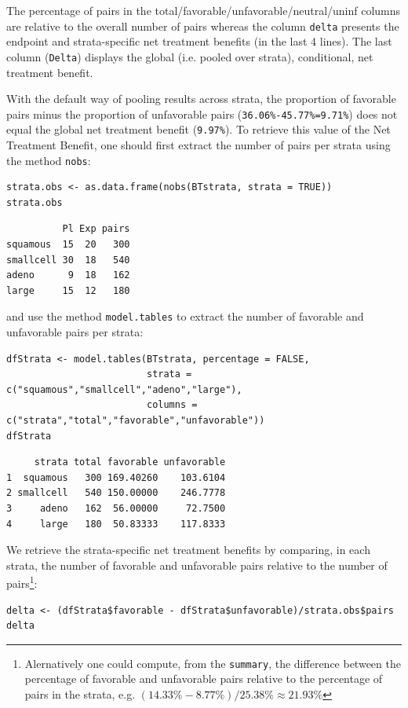 \documentclass[12pt]{article}
\newcommand\Warning[1][3ex]{%
\renewcommand\stacktype{L}%
\scaleto{\stackon[1.3pt]{\color{red}$\triangle$}{\tiny\bfseries !}}{#1}%
\xspace
}
\begin{document}
The percentage of pairs in the
total/favorable/unfavorable/neutral/uninf columns are relative to the
overall number of pairs whereas the column \texttt{delta} presents the
endpoint and strata-specific net treatment benefits (in the last 4
lines). The last column (\texttt{Delta}) displays the global (i.e. pooled
over strata), conditional, net treatment benefit. \newline \Warning
With the default way of pooling results across strata, the proportion
of favorable pairs minus the proportion of unfavorable pairs
(\texttt{36.06\%-45.77\%=9.71\%}) does not equal the global net treatment
benefit (\texttt{9.97\%}). To retrieve this value of the Net Treatment
Benefit, one should first extract the number of pairs per strata using
the method \texttt{nobs}:
\lstset{language=r,label= ,caption= ,captionpos=b,numbers=none}
\begin{lstlisting}
strata.obs <- as.data.frame(nobs(BTstrata, strata = TRUE))
strata.obs
\end{lstlisting}

\begin{verbatim}
          Pl Exp pairs
squamous  15  20   300
smallcell 30  18   540
adeno      9  18   162
large     15  12   180
\end{verbatim}


and use the method \texttt{model.tables} to extract the number of favorable and unfavorable
pairs per strata:
\lstset{language=r,label= ,caption= ,captionpos=b,numbers=none}
\begin{lstlisting}
dfStrata <- model.tables(BTstrata, percentage = FALSE,
                         strata = c("squamous","smallcell","adeno","large"),
                         columns = c("strata","total","favorable","unfavorable"))
dfStrata
\end{lstlisting}

\begin{verbatim}
     strata total favorable unfavorable
1  squamous   300 169.40260    103.6104
2 smallcell   540 150.00000    246.7778
3     adeno   162  56.00000     72.7500
4     large   180  50.83333    117.8333
\end{verbatim}


We retrieve the strata-specific net treatment benefits by comparing, in each
strata, the number of favorable and unfavorable pairs relative to the
number of pairs\footnote{Alernatively one could compute, from the \texttt{summary}, the difference
between the percentage of favorable and unfavorable pairs relative to
the percentage of pairs in the strata, e.g. \((14.33\%-8.77\%)/25.38\%
\approx 21.93\%\)}:
\lstset{language=r,label= ,caption= ,captionpos=b,numbers=none}
\begin{lstlisting}
delta <- (dfStrata$favorable - dfStrata$unfavorable)/strata.obs$pairs
delta
\end{lstlisting}
\end{document}
